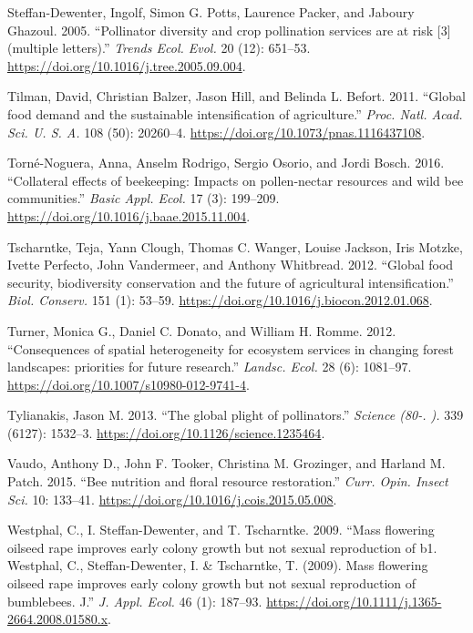 \documentclass[11pt,]{article}
\begin{document}
\leavevmode\hypertarget{ref-Steffan-Dewenter2005c}{}%
Steffan-Dewenter, Ingolf, Simon G. Potts, Laurence Packer, and Jaboury
Ghazoul. 2005. ``Pollinator diversity and crop pollination services are
at risk {[}3{]} (multiple letters).'' \emph{Trends Ecol. Evol.} 20 (12):
651--53. \url{https://doi.org/10.1016/j.tree.2005.09.004}.

\leavevmode\hypertarget{ref-Tilman2011}{}%
Tilman, David, Christian Balzer, Jason Hill, and Belinda L. Befort.
2011. ``Global food demand and the sustainable intensification of
agriculture.'' \emph{Proc. Natl. Acad. Sci. U. S. A.} 108 (50):
20260--4. \url{https://doi.org/10.1073/pnas.1116437108}.

\leavevmode\hypertarget{ref-Torne-Noguera2016}{}%
Torné-Noguera, Anna, Anselm Rodrigo, Sergio Osorio, and Jordi Bosch.
2016. ``Collateral effects of beekeeping: Impacts on pollen-nectar
resources and wild bee communities.'' \emph{Basic Appl. Ecol.} 17 (3):
199--209. \url{https://doi.org/10.1016/j.baae.2015.11.004}.

\leavevmode\hypertarget{ref-Tscharntke2012}{}%
Tscharntke, Teja, Yann Clough, Thomas C. Wanger, Louise Jackson, Iris
Motzke, Ivette Perfecto, John Vandermeer, and Anthony Whitbread. 2012.
``Global food security, biodiversity conservation and the future of
agricultural intensification.'' \emph{Biol. Conserv.} 151 (1): 53--59.
\url{https://doi.org/10.1016/j.biocon.2012.01.068}.

\leavevmode\hypertarget{ref-Turner2012}{}%
Turner, Monica G., Daniel C. Donato, and William H. Romme. 2012.
``Consequences of spatial heterogeneity for ecosystem services in
changing forest landscapes: priorities for future research.''
\emph{Landsc. Ecol.} 28 (6): 1081--97.
\url{https://doi.org/10.1007/s10980-012-9741-4}.

\leavevmode\hypertarget{ref-Tylianakis2013a}{}%
Tylianakis, Jason M. 2013. ``The global plight of pollinators.''
\emph{Science (80-. ).} 339 (6127): 1532--3.
\url{https://doi.org/10.1126/science.1235464}.

\leavevmode\hypertarget{ref-Vaudo2015}{}%
Vaudo, Anthony D., John F. Tooker, Christina M. Grozinger, and Harland
M. Patch. 2015. ``Bee nutrition and floral resource restoration.''
\emph{Curr. Opin. Insect Sci.} 10: 133--41.
\url{https://doi.org/10.1016/j.cois.2015.05.008}.

\leavevmode\hypertarget{ref-Westphal2009a}{}%
Westphal, C., I. Steffan-Dewenter, and T. Tscharntke. 2009. ``Mass
flowering oilseed rape improves early colony growth but not sexual
reproduction of b1. Westphal, C., Steffan-Dewenter, I. \& Tscharntke, T.
(2009). Mass flowering oilseed rape improves early colony growth but not
sexual reproduction of bumblebees. J.'' \emph{J. Appl. Ecol.} 46 (1):
187--93. \url{https://doi.org/10.1111/j.1365-2664.2008.01580.x}.
\end{document}
